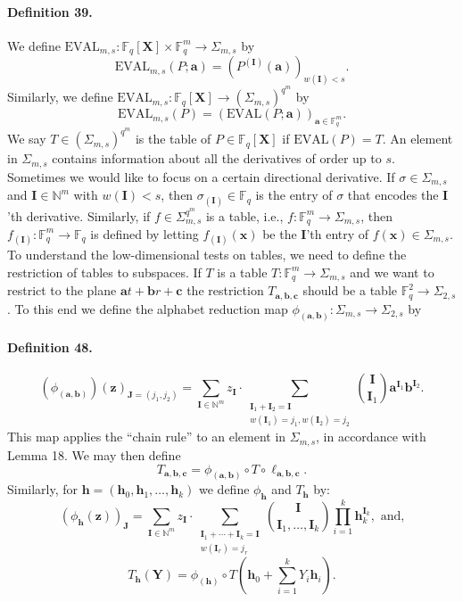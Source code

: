 \documentclass[10pt,a4paper]{article}
\begin{document}
\paragraph{Definition 39.} We define $\mathrm{EVAL}_{m,s}:\mathbb F_q[\boldsymbol X]\times\mathbb F_q^m\to\Sigma_{m,s}$ by
\[\mathrm{EVAL}_{m,s}(P;\boldsymbol a)=(P^{(\boldsymbol I)}(\boldsymbol a))_{w(\boldsymbol I)<s}.\]
Similarly, we define $\mathrm{EVAL}_{m,s}:\mathbb F_q[\boldsymbol X]\to(\Sigma_{m,s})^{q^m}$ by
\[\mathrm{EVAL}_{m,s}(P)=(\mathrm{EVAL}(P;\boldsymbol a))_{\boldsymbol a\in\mathbb F_q^m}.\]
We say $T\in(\Sigma_{m,s})^{q^m}$ is the table of $P\in\mathbb F_q[\boldsymbol X]$ if $\mathrm{EVAL}(P)=T$.
An element in $\Sigma_{m,s}$ contains information about all the derivatives of order up to $s$. Sometimes we would like to focus on a certain directional derivative. If $\sigma\in\Sigma_{m,s}$ and $\boldsymbol I\in\mathbb N^m$ with $w(\boldsymbol I)<s$, then $\sigma_{(\boldsymbol I)}\in\mathbb F_q$ is the entry of $\sigma$ that encodes the $\boldsymbol I$'th derivative. Similarly, if $f\in\Sigma_{m,s}^{q^m}$ is a table, i.e., $f:\mathbb F_q^m\to\Sigma_{m,s}$, then $f_{(\boldsymbol I)}:\mathbb F_q^m\to\mathbb F_q$ is defined by letting $f_{(\boldsymbol I)}(\boldsymbol x)$ be the $\boldsymbol I$'th entry of $f(\boldsymbol x)\in\Sigma_{m,s}$.
To understand the low-dimensional tests on tables, we need to define the restriction of tables to subspaces. If $T$ is a table $T:\mathbb F_q^m\to\Sigma_{m,s}$ and we want to restrict to the plane $\boldsymbol a t+\boldsymbol b r+\boldsymbol c$ the restriction $T_{\boldsymbol a,\boldsymbol b,\boldsymbol c}$ should be a table $\mathbb F_q^2\to\Sigma_{2,s}$. To this end we define the alphabet reduction map $\phi_{(\boldsymbol a,\boldsymbol b)}:\Sigma_{m,s}\to\Sigma_{2,s}$ by
\paragraph{Definition 48.}
\[(\phi_{(\boldsymbol a,\boldsymbol b)})(\boldsymbol z)_{\boldsymbol J=(j_1,j_2)}=\sum_{\boldsymbol I\in\mathbb N^m}z_{\boldsymbol I}\cdot\sum_{\substack{\boldsymbol I_1+\boldsymbol I_2=\boldsymbol I\\w(\boldsymbol I_1)=j_1,w(\boldsymbol I_2)=j_2}}\binom{\boldsymbol I}{\boldsymbol I_1}\boldsymbol a^{\boldsymbol I_1}\boldsymbol b^{\boldsymbol I_2}.\]
This map applies the ``chain rule'' to an element in $\Sigma_{m,s}$, in accordance with Lemma 18. We may then define
\[T_{\boldsymbol a,\boldsymbol b,\boldsymbol c}=\phi_{(\boldsymbol a,\boldsymbol b)}\circ T\circ\ell_{\boldsymbol a,\boldsymbol b,\boldsymbol c}.\]
Similarly, for $\boldsymbol h=(\boldsymbol h_0,\boldsymbol h_1,\ldots,\boldsymbol h_k)$ we define $\phi_{\boldsymbol h}$ and $T_{\boldsymbol h}$ by:
\[(\phi_{\boldsymbol h}(\boldsymbol z))_{\boldsymbol J}=\sum_{\boldsymbol I\in\mathbb N^m}z_{\boldsymbol I}\cdot\sum_{\substack{\boldsymbol I_1+\cdots+\boldsymbol I_k=\boldsymbol I\\w(\boldsymbol I_r)=j_r}}\binom{\boldsymbol I}{\boldsymbol I_1,\ldots,\boldsymbol I_k}\prod_{i=1}^k\boldsymbol h_k^{\boldsymbol I_k},\text{ and,}\]
\[T_{\boldsymbol h}(\boldsymbol Y)=\phi_{(\boldsymbol h)}\circ T\left(\boldsymbol h_0+\sum_{i=1}^kY_i\boldsymbol h_i\right).\]
\end{document}
